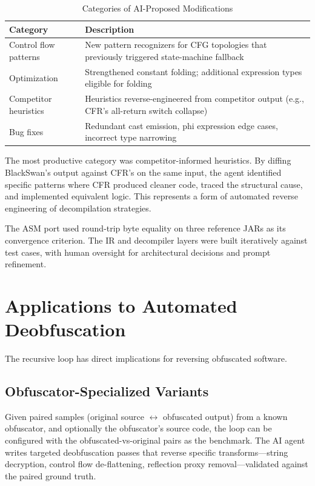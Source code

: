 \documentclass[conference,11pt]{IEEEtran}
\begin{document}
\begin{table}[t]
\centering
\caption{Categories of AI-Proposed Modifications}
\label{tab:modifications}
\footnotesize
\setlength{\tabcolsep}{3pt}
\begin{tabular}{@{}p{}p{}@{}}
\toprule
\textbf{Category} & \textbf{Description} \\
\midrule
Control flow patterns & New pattern recognizers for CFG topologies that previously triggered state-machine fallback \\
\addlinespace
Optimization & Strengthened constant folding; additional expression types eligible for folding \\
\addlinespace
Competitor heuristics & Heuristics reverse-engineered from competitor output (e.g., CFR's all-return switch collapse) \\
\addlinespace
Bug fixes & Redundant cast emission, phi expression edge cases, incorrect type narrowing \\
\bottomrule
\end{tabular}
\end{table}

The most productive category was competitor-informed heuristics. By diffing BlackSwan's output against CFR's on the same input, the agent identified specific patterns where CFR produced cleaner code, traced the structural cause, and implemented equivalent logic. This represents a form of automated reverse engineering of decompilation strategies.

The ASM port used round-trip byte equality on three reference JARs as its convergence criterion. The IR and decompiler layers were built iteratively against test cases, with human oversight for architectural decisions and prompt refinement.

\section{Applications to Automated Deobfuscation}
\label{sec:deobfuscation}

The recursive loop has direct implications for reversing obfuscated software.

\subsection{Obfuscator-Specialized Variants}

Given paired samples (original source $\leftrightarrow$ obfuscated output) from a known obfuscator, and optionally the obfuscator's source code, the loop can be configured with the obfuscated-vs-original pairs as the benchmark. The AI agent writes targeted deobfuscation passes that reverse specific transforms---string decryption, control flow de-flattening, reflection proxy removal---validated against the paired ground truth.
\end{document}
